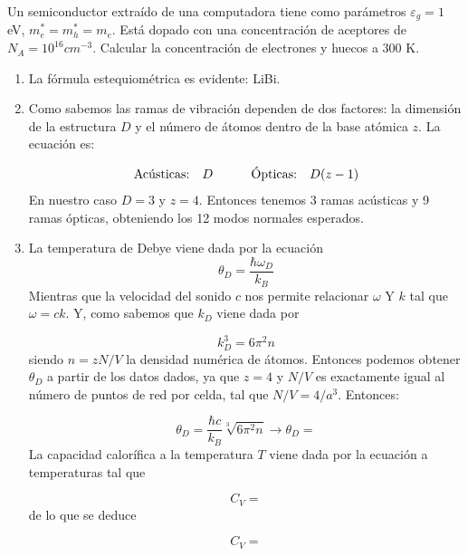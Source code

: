 \begin{ejercicio}
	Un semiconductor extraído de una computadora tiene como parámetros $\varepsilon_g = 1$ eV, $m_e^* = m_h^* = m_e$. Está dopado con una concentración de aceptores de $N_A = 10^{16} \unit{cm}^{-3}$. Calcular la concentración de electrones y huecos a 300 K. 
\end{ejercicio}	


\begin{solucion}
	\begin{enumerate}[label=\alph*)]
		\item La fórmula estequiométrica es evidente: LiBi.
		\item Como sabemos las ramas de vibración dependen de dos factores: la dimensión de la estructura $D$ y el número de átomos dentro de la base atómica $z$. La ecuación es:
		
		\begin{equation}
			\text{Acústicas:} \quad D  \quad \quad \quad
			\text{Ópticas:} \quad D(z-1)
		\end{equation}
		En nuestro caso $D=3$ y $z=4$. Entonces tenemos 3 ramas acústicas y 9 ramas ópticas, obteniendo los 12 modos normales esperados. 
		
		
		\item La temperatura de Debye viene dada por la ecuación
		\begin{equation*}
			\theta_D= \frac{\hbar \omega_D}{k_B}
		\end{equation*}
		Mientras que la velocidad del sonido $c$ nos permite relacionar $\omega$ Y $k$ tal que $\omega = c k$. Y, como sabemos que $k_D$ viene dada por
		
		\begin{equation*}
			k_D^3 = 6 \pi^2 n
		\end{equation*}
		siendo $n=zN/V$ la densidad numérica de átomos. Entonces podemos obtener $\theta_D$ a partir de los datos dados, ya que $z=4$ y $N/V$ es exactamente igual al número de puntos de red por celda, tal que $N/V=4/a^3$. Entonces:
		
		\begin{equation}
			\theta_D = \frac{\hbar c}{k_B} \sqrt[3]{6\pi^2 n} \longrightarrow \theta_D = 
		\end{equation}
		La capacidad calorífica a la temperatura $T$ viene dada por la ecuación a temperaturas tal que
		
		\begin{equation}
			C_V = 
		\end{equation} 
		de lo que se deduce 
		
		\begin{equation}
			C_V = 
		\end{equation}
		
	\end{enumerate}
	
\end{solucion}	

